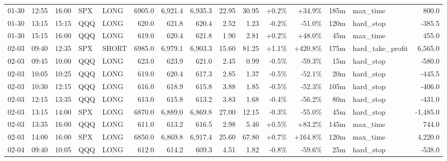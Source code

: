 \documentclass[11pt,a4paper,twoside]{article}
\begin{document}
\begin{landscape}
\begin{center}
\begin{longtable}{>{\color{txtmain}}l l l l l r r r r r r r r >{\color{txtmain}}l r}
01-30 & 12:55 & 16:00 & SPX & LONG & 6905.0 & 6,921.4 & 6,935.3 & 22.95 & 30.95 & \textcolor{wingreen}{+0.2\%} & \textcolor{wingreen}{+34.9\%} & 185m & max\_time & \textcolor{wingreen}{800.0} \\
01-30 & 13:15 & 15:15 & QQQ & LONG & 620.0 & 621.8 & 620.4 & 2.52 & 1.23 & \textcolor{lossred}{-0.2\%} & \textcolor{lossred}{-51.0\%} & 120m & hard\_stop & \textcolor{lossred}{-385.5} \\
01-30 & 15:15 & 16:00 & QQQ & LONG & 619.0 & 620.4 & 621.8 & 1.90 & 2.81 & \textcolor{wingreen}{+0.2\%} & \textcolor{wingreen}{+48.0\%} & 45m & max\_time & \textcolor{wingreen}{455.0} \\
02-03 & 09:40 & 12:35 & SPX & SHORT & 6985.0 & 6,979.1 & 6,903.3 & 15.60 & 81.25 & \textcolor{wingreen}{+1.1\%} & \textcolor{wingreen}{+420.8\%} & 175m & hard\_take\_profit & \textcolor{wingreen}{6,565.0} \\
02-03 & 09:45 & 10:00 & QQQ & LONG & 623.0 & 623.9 & 621.0 & 2.45 & 0.99 & \textcolor{lossred}{-0.5\%} & \textcolor{lossred}{-59.3\%} & 15m & hard\_stop & \textcolor{lossred}{-580.0} \\
02-03 & 10:05 & 10:25 & QQQ & LONG & 619.0 & 620.4 & 617.3 & 2.85 & 1.37 & \textcolor{lossred}{-0.5\%} & \textcolor{lossred}{-52.1\%} & 20m & hard\_stop & \textcolor{lossred}{-445.5} \\
02-03 & 10:30 & 12:15 & QQQ & LONG & 616.0 & 618.9 & 615.8 & 3.88 & 1.85 & \textcolor{lossred}{-0.5\%} & \textcolor{lossred}{-52.3\%} & 105m & hard\_stop & \textcolor{lossred}{-406.0} \\
02-03 & 12:15 & 13:35 & QQQ & LONG & 613.0 & 615.8 & 613.2 & 3.83 & 1.68 & \textcolor{lossred}{-0.4\%} & \textcolor{lossred}{-56.2\%} & 80m & hard\_stop & \textcolor{lossred}{-431.0} \\
02-03 & 13:15 & 14:00 & SPX & LONG & 6870.0 & 6,889.0 & 6,869.8 & 27.00 & 12.15 & \textcolor{lossred}{-0.3\%} & \textcolor{lossred}{-55.0\%} & 45m & hard\_stop & \textcolor{lossred}{-1,485.0} \\
02-03 & 13:35 & 16:00 & QQQ & LONG & 611.0 & 613.2 & 616.5 & 2.98 & 5.46 & \textcolor{wingreen}{+0.5\%} & \textcolor{wingreen}{+83.2\%} & 145m & max\_time & \textcolor{wingreen}{744.0} \\
02-03 & 14:00 & 16:00 & SPX & LONG & 6850.0 & 6,869.8 & 6,917.4 & 25.60 & 67.80 & \textcolor{wingreen}{+0.7\%} & \textcolor{wingreen}{+164.8\%} & 120m & max\_time & \textcolor{wingreen}{4,220.0} \\
02-04 & 09:40 & 10:05 & QQQ & LONG & 612.0 & 614.2 & 609.3 & 4.51 & 1.82 & \textcolor{lossred}{-0.8\%} & \textcolor{lossred}{-59.6\%} & 25m & hard\_stop & \textcolor{lossred}{-538.0} \\

\end{longtable}
\end{center}
\end{landscape}
\end{document}
